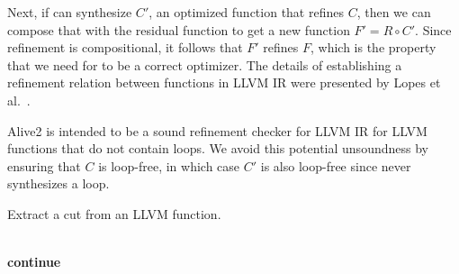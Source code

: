 Next, if \minotaur{} can synthesize $C'$, an optimized function that
refines $C$, then we can compose that with the residual function to
get a new function $F' = R \circ C'$.
%
Since refinement is compositional, it follows that $F'$ refines $F$,
which is the property that we need for \minotaur{} to be a correct
optimizer.
%
The details of establishing a refinement relation between functions in
LLVM IR were presented by Lopes et al.~\cite{alive2}.


Alive2 is intended to be a sound refinement checker for LLVM
IR for LLVM functions that do not contain loops.
%
We avoid this potential unsoundness by ensuring that $C$ is loop-free,
in which case $C'$ is also loop-free since \minotaur{} never synthesizes a
loop.



\begin{algorithm}[tbp]
  \caption{Extract a cut from an LLVM function.}
  \begin{algorithmic}[1]
  \Else
  \EndIf
  \\
  \State \textbf{continue}
  \EndIf
  \EndIf
  \EndIf
  \EndIf
  \EndIf

  \Else


\end{algorithmic}
\end{algorithm}
